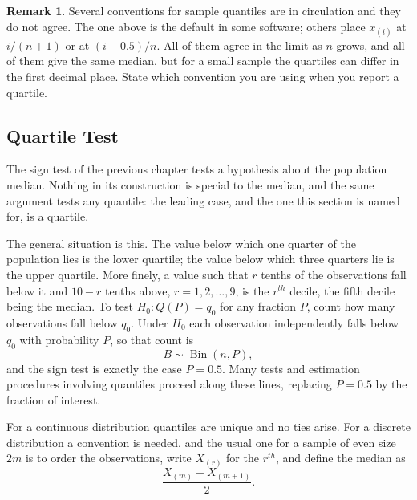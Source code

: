 \documentclass[11pt,a4paper]{article}
\theoremstyle{definition}
\newtheorem{remark}[thm]{Remark}
\begin{document}
\begin{remark}
Several conventions for sample quantiles are in circulation and they do not agree.
The one above is the default in some software; others place $x_{(i)}$ at $i/(n+1)$
or at $(i-0.5)/n$. All of them agree in the limit as $n$ grows, and all of them
give the same median, but for a small sample the quartiles can differ in the first
decimal place. State which convention you are using when you report a quartile.
\end{remark}

\subsection{Quartile Test}
The sign test of the previous chapter tests a hypothesis about the population
median. Nothing in its construction is special to the median, and the same
argument tests any quantile: the leading case, and the one this section is named
for, is a quartile.

The general situation is this. The value below which one quarter of the population
lies is the lower quartile; the value below which three quarters lie is the upper
quartile. More finely, a value such that $r$ tenths of the observations fall below
it and $10-r$ tenths above, $r=1,2,\dots,9$, is the $r^{th}$ decile, the fifth
decile being the median. To test $H_0:Q(P)=q_0$ for any fraction $P$, count how
many observations fall below $q_0$. Under $H_0$ each observation independently
falls below $q_0$ with probability $P$, so that count is
$$B\sim \operatorname{Bin}(n,P),$$
and the sign test is exactly the case $P=0.5$. Many tests and estimation
procedures involving quantiles proceed along these lines, replacing $P=0.5$ by the
fraction of interest.

For a continuous distribution quantiles are unique and no ties arise. For a
discrete distribution a convention is needed, and the usual one for a sample of
even size $2m$ is to order the observations, write $X_{(r)}$ for the $r^{th}$, and
define the median as
$$\dfrac{X_{(m)}+X_{(m+1)}}{2}.$$
\end{document}
